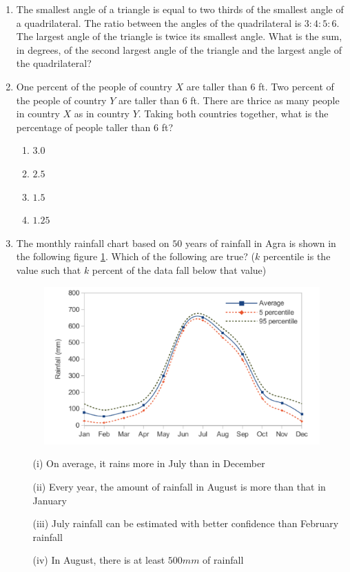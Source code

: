 \documentclass[journal]{IEEEtran}
\begin{document}
\begin{enumerate}
    \item The smallest angle of a triangle is equal to two thirds of the smallest angle of a quadrilateral. The ratio between the angles of the quadrilateral is $3:4:5:6$. The largest angle of the triangle is twice its smallest angle. What is the sum, in degrees, of the second largest angle of the triangle and the largest angle of the quadrilateral?
    \item One percent of the people of country $X$ are taller than $6$ ft. Two percent of the people of country $Y$ are taller than $6$ ft. There are thrice as many people in country $X$ as in country $Y$. Taking both countries together, what is the percentage of people taller than $6$ ft?
        \begin{enumerate}
            \item $3.0$
            \item $2.5$
            \item $1.5$
            \item $1.25$
        \end{enumerate}

    \item \label{10} The monthly rainfall chart based on $50$ years of rainfall in Agra is shown in the following figure \ref{10fig}. Which of the following are true? ($k$ percentile is the value such that $k$ percent of the data fall below that value)
        \begin{figure}[H]
            \centering
            \includegraphics[width = 1\linewidth]{figs/10.png}
            \caption{}
            \label{10fig}
        \end{figure}

        \begin{itemize}
            \item[(i)] On average, it rains more in July than in December
            \item[(ii)] Every year, the amount of rainfall in August is more than that in January
            \item[(iii)] July rainfall can be estimated with better confidence than February rainfall
            \item[(iv)] In August, there is at least $500 mm$ of rainfall
        \end{itemize}


\end{enumerate}
\end{document}
